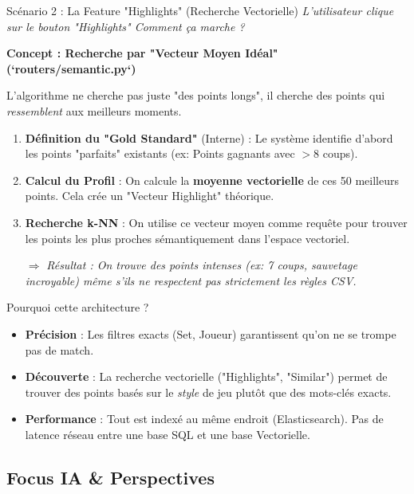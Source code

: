 \documentclass[aspectratio=169, 11pt]{beamer}
\begin{document}
\begin{frame}{Scénario 2 : La Feature "Highlights" (Recherche Vectorielle)}
    \textit{L'utilisateur clique sur le bouton "Highlights" \textrightarrow{} Comment ça marche ?}
    
    \textbf{Concept : Recherche par "Vecteur Moyen Idéal" (`routers/semantic.py`)}
    
    L'algorithme ne cherche pas juste "des points longs", il cherche des points qui \textit{ressemblent} aux meilleurs moments.
    
    \begin{enumerate}
        \item \textbf{Définition du "Gold Standard"} (Interne) : 
        Le système identifie d'abord les points "parfaits" existants (ex: Points gagnants avec $>8$ coups).
        \item \textbf{Calcul du Profil} : 
        On calcule la \textbf{moyenne vectorielle} de ces 50 meilleurs points. Cela crée un "Vecteur Highlight" théorique.
        \item \textbf{Recherche k-NN} :
        On utilise ce vecteur moyen comme requête pour trouver les points les plus proches sémantiquement dans l'espace vectoriel.
        
        $\Rightarrow$ \textit{Résultat : On trouve des points intenses (ex: 7 coups, sauvetage incroyable) même s'ils ne respectent pas strictement les règles CSV.}
    \end{enumerate}
\end{frame}

\begin{frame}{Pourquoi cette architecture ?}
    \begin{itemize}
        \item \textbf{Précision} : Les filtres exacts (Set, Joueur) garantissent qu'on ne se trompe pas de match.
        \item \textbf{Découverte} : La recherche vectorielle ("Highlights", "Similar") permet de trouver des points basés sur le \textit{style} de jeu plutôt que des mots-clés exacts.
        \item \textbf{Performance} : Tout est indexé au même endroit (Elasticsearch). Pas de latence réseau entre une base SQL et une base Vectorielle.
    \end{itemize}
\end{frame}

\subsection{Focus IA \& Perspectives}
\end{document}
